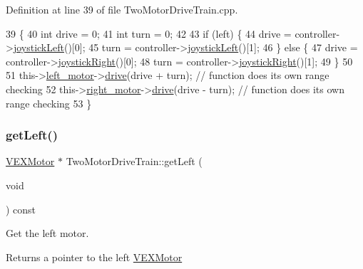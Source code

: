 Definition at line 39 of file Two\+Motor\+Drive\+Train.\+cpp.


\begin{DoxyCode}
39                                                                       \{
40     \textcolor{keywordtype}{int} drive = 0;
41     \textcolor{keywordtype}{int} turn = 0;
42 
43     \textcolor{keywordflow}{if} (left) \{
44         drive = controller->\hyperlink{class_controller_a98b5d8b11463780ac75d90fed3bd627d}{joystickLeft}()[0];
45         turn = controller->\hyperlink{class_controller_a98b5d8b11463780ac75d90fed3bd627d}{joystickLeft}()[1];
46     \} \textcolor{keywordflow}{else} \{
47         drive = controller->\hyperlink{class_controller_a99b39f4782ef2164dc3d3d1b512330bd}{joystickRight}()[0];
48         turn = controller->\hyperlink{class_controller_a99b39f4782ef2164dc3d3d1b512330bd}{joystickRight}()[1];
49     \}
50 
51     this->\hyperlink{class_two_motor_drive_train_a134c95e1f45a5156924208cddaa3661f}{left\_motor}->\hyperlink{class_v_e_x_motor_ac8ab5c30e4be4a9e3ed290e7827bcf1a}{drive}(drive + turn); \textcolor{comment}{// function does its own range checking}
52     this->\hyperlink{class_two_motor_drive_train_a0bdefa7c731c2407ad4a4dad0902bbd3}{right\_motor}->\hyperlink{class_v_e_x_motor_ac8ab5c30e4be4a9e3ed290e7827bcf1a}{drive}(drive - turn); \textcolor{comment}{// function does its own range checking}
53 \}
\end{DoxyCode}
\mbox{\label{class_two_motor_drive_train_a416c665218391af6cf398a9a195ec23b}} 
\subsubsection{\texorpdfstring{get\+Left()}{getLeft()}}
{\footnotesize\ttfamily \hyperlink{class_v_e_x_motor}{V\+E\+X\+Motor} $\ast$ Two\+Motor\+Drive\+Train\+::get\+Left (\begin{DoxyParamCaption}\item[{void}]{ }\end{DoxyParamCaption}) const}



Get the left motor. 

\begin{DoxyReturn}{Returns}
a pointer to the left \hyperlink{class_v_e_x_motor}{V\+E\+X\+Motor} 
\end{DoxyReturn}



